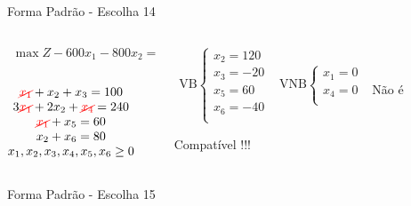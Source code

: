 \begin{frame}
{\begin{block}{Forma Padrão - {\color{cyan}Escolha 14}}
			\begin{columns}
				\begin{column}{0.35\textwidth}
					$
						\begin{matrix}
							\max Z - 600x_1 - 800x_2 = 0 \\
						\end{matrix}
					$ \\
					 \\
					$
						\begin{matrix}
							{\color{red}\cancel{x_1}}  + x_2  + x_3                   = 100 \\
							3{\color{red}\cancel{x_1}} + 2x_2       + {\color{red}\cancel{x_4}}             = 240 \\
							{\color{red}\cancel{x_1}}                     + x_5       = 60 \\
							x_2                           + x_6 = 80 \\
							x_1,x_2, x_3, x_4, x_5, x_6 \ge 0 \\
						\end{matrix}
					$
				\end{column}
				\vline
				\hspace{0.1cm}
				\begin{column}{0.45\textwidth}
						$
							\begin{matrix}
								\text{VB} \left\{  \begin{matrix}
																 x_2 = 120 \\
																 x_3 = -20 \\
																 x_5 = 60 \\
																 x_6 = -40 \\
												   \end{matrix} 
										   \right.
								&
								\text{VNB} \left\{  \begin{matrix}
																 x_1 = 0 \\
																 x_4 = 0 \\
												   \end{matrix} 
										   \right. 
								\\
							 & \\
							\end{matrix}
						$
						{\color{red}Não é Compatível !!!}
				\end{column}
			\end{columns}
		\end{block}
	}
	{
		\begin{block}{Forma Padrão - {\color{cyan}Escolha 15}}

\end{block}}
\end{frame}

